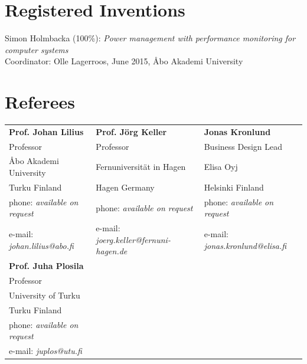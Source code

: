 \documentclass[margin,line]{resume}
\begin{document}
\begin{resume}
\section{\mysidestyle Registered Inventions}
Simon Holmbacka (100\%):
\textit{Power management with performance monitoring for computer systems}\\Coordinator: Olle Lagerroos, June 2015, \AA{}bo Akademi University

\section{\mysidestyle Referees} 

\begin{tabular}{@{}p{4.2cm}p{6cm}p{5cm}}
\textbf{Prof. Johan Lilius}       &  \textbf{Prof. J\"{o}rg Keller}	&  \textbf{Jonas Kronlund}                   \\
Professor                               &  Professor & Business Design Lead                       \\
\AA{}bo Akademi University                     &  Fernuniversit\"{a}t in Hagen   &   Elisa Oyj                 \\
Turku Finland			           &  Hagen Germany        & Helsinki Finland\\
phone: \textsl{available on request}    &  phone: \textsl{available on request}  &  phone: \textsl{available on request}      \\
e-mail: \textsl{johan.lilius@abo.fi}   &  e-mail: \textsl{joerg.keller@fernuni-hagen.de}  &  e-mail: \textsl{jonas.kronlund@elisa.fi}   \\
\vspace{0.5cm}
\textbf{Prof. Juha Plosila} & &\\
Professor & &\\
University of Turku & &\\
Turku Finland & &\\
phone: \textsl{available on request} & &\\
e-mail: \textsl{juplos@utu.fi} & &\\
\end{tabular}






\end{resume}
\end{document}
